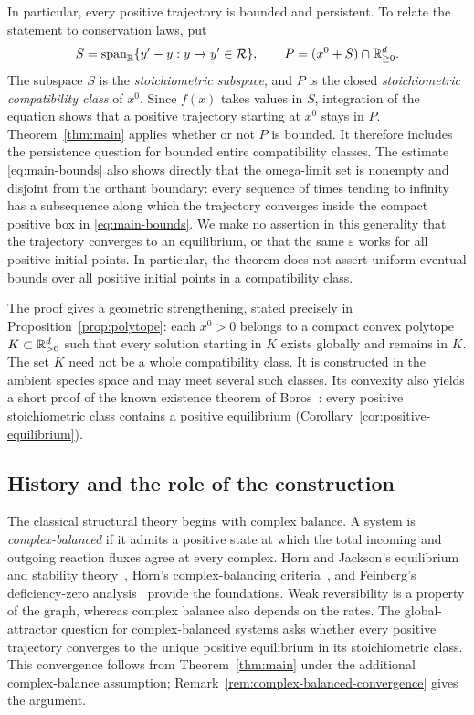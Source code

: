 In particular, every positive trajectory is bounded and persistent.
To relate the statement to conservation laws, put
\[
 S=\operatorname{span}_{\mathbb R}\{y'-y:y\to y'\in\mathcal R\},
 \qquad
 P=(x^0+S)\cap\mathbb R_{\ge0}^d.
\]
The subspace $S$ is the \emph{stoichiometric subspace}, and $P$ is the
closed \emph{stoichiometric compatibility class} of $x^0$. Since $f(x)$
takes values in $S$, integration of the equation shows that a positive
trajectory starting at $x^0$ stays in $P$.
Theorem~\ref{thm:main} applies whether or not $P$ is bounded. It therefore
includes the persistence question for bounded entire compatibility
classes. The estimate \eqref{eq:main-bounds} also shows directly that the
omega-limit set is nonempty and disjoint from the orthant boundary:
every sequence of times tending to infinity has a subsequence along which
the trajectory converges inside the compact positive box in
\eqref{eq:main-bounds}.
We make no assertion in this generality that the trajectory converges to an
equilibrium, or that the same $\varepsilon$ works for all positive initial
points.
In particular, the theorem does not assert uniform eventual bounds over
all positive initial points in a compatibility class.

The proof gives a geometric strengthening, stated precisely in
Proposition~\ref{prop:polytope}: each $x^0>0$ belongs to a compact convex
polytope $K\subset\mathbb R_{>0}^d$ such that every solution starting in $K$
exists globally and remains in $K$. The set $K$ need not be a whole
compatibility class. It is constructed in the ambient species space and
may meet several such classes. Its convexity also yields a short proof
of the known existence theorem of Boros~\cite{Boros2019}: every positive
stoichiometric class contains a positive equilibrium
(Corollary~\ref{cor:positive-equilibrium}).

\subsection{History and the role of the construction}

The classical structural theory begins with complex balance.
A system is \emph{complex-balanced} if it admits a positive state at
which the total incoming and outgoing reaction fluxes agree at every
complex. Horn and Jackson's equilibrium and stability
theory~\cite{HornJackson1972}, Horn's complex-balancing
criteria~\cite{Horn1972}, and Feinberg's deficiency-zero
analysis~\cite{Feinberg1972} provide the foundations. Weak reversibility
is a property of the graph, whereas complex balance also depends on the
rates. The global-attractor question for complex-balanced systems asks
whether every positive trajectory converges to the unique positive
equilibrium in its stoichiometric class. This convergence follows from
Theorem~\ref{thm:main} under the additional complex-balance assumption;
Remark~\ref{rem:complex-balanced-convergence} gives the argument.

